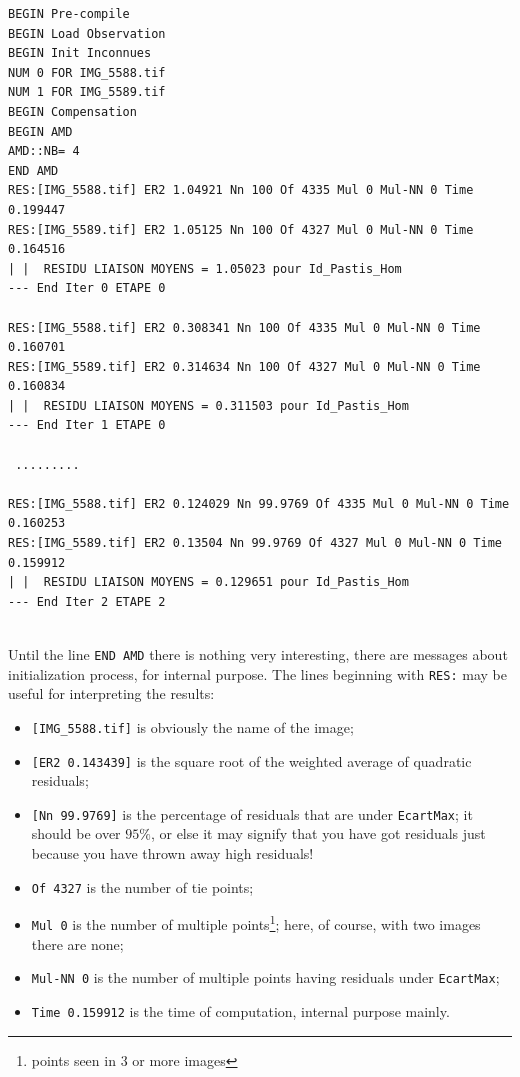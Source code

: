 {\scriptsize
\begin{verbatim}
BEGIN Pre-compile
BEGIN Load Observation
BEGIN Init Inconnues
NUM 0 FOR IMG_5588.tif
NUM 1 FOR IMG_5589.tif
BEGIN Compensation
BEGIN AMD 
AMD::NB= 4
END AMD 
RES:[IMG_5588.tif] ER2 1.04921 Nn 100 Of 4335 Mul 0 Mul-NN 0 Time 0.199447
RES:[IMG_5589.tif] ER2 1.05125 Nn 100 Of 4327 Mul 0 Mul-NN 0 Time 0.164516
| |  RESIDU LIAISON MOYENS = 1.05023 pour Id_Pastis_Hom
--- End Iter 0 ETAPE 0

RES:[IMG_5588.tif] ER2 0.308341 Nn 100 Of 4335 Mul 0 Mul-NN 0 Time 0.160701
RES:[IMG_5589.tif] ER2 0.314634 Nn 100 Of 4327 Mul 0 Mul-NN 0 Time 0.160834
| |  RESIDU LIAISON MOYENS = 0.311503 pour Id_Pastis_Hom
--- End Iter 1 ETAPE 0

 .........

RES:[IMG_5588.tif] ER2 0.124029 Nn 99.9769 Of 4335 Mul 0 Mul-NN 0 Time 0.160253
RES:[IMG_5589.tif] ER2 0.13504 Nn 99.9769 Of 4327 Mul 0 Mul-NN 0 Time 0.159912
| |  RESIDU LIAISON MOYENS = 0.129651 pour Id_Pastis_Hom
--- End Iter 2 ETAPE 2


\end{verbatim}
}

Until the line {\tt END AMD} there is nothing very interesting, there
are messages about initialization process, for internal purpose.
The lines beginning with {\tt RES:} may be useful for interpreting the results:

\begin{itemize}
    \item {\tt [IMG\_5588.tif]} is obviously the name of the image;

    \item {\tt [ER2 0.143439]} is the square root of the weighted average of quadratic residuals;
    
    \item {\tt [Nn 99.9769]} is the percentage of residuals that are under {\tt EcartMax};
          it should be over $95\%$, or else it may signify that you have got residuals just
          because you have thrown away high residuals!

    \item {\tt Of 4327} is the number of tie points;
    \item {\tt Mul 0} is the number of multiple points\footnote{points seen in $3$ or more images};
          here, of course, with two images there are none;

    \item {\tt Mul-NN 0} is the number of multiple points having residuals under {\tt EcartMax};

        \item {\tt Time 0.159912} is the time of computation, internal purpose mainly.
\end{itemize}

